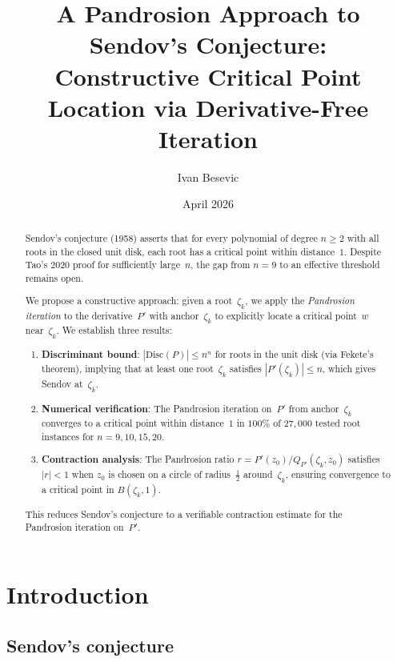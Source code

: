 \documentclass[11pt,a4paper]{article}
\title{A Pandrosion Approach to Sendov's Conjecture:\\Constructive Critical Point Location via Derivative-Free Iteration}
\author{Ivan Besevic}
\date{April 2026}
\theoremstyle{definition}
\theoremstyle{remark}
\begin{document}
\maketitle

\begin{abstract}
Sendov's conjecture (1958) asserts that for every polynomial of degree $n \geq 2$ with all roots in the closed unit disk, each root has a critical point within distance~$1$.  Despite Tao's 2020 proof for sufficiently large~$n$, the gap from $n = 9$ to an effective threshold remains open.

We propose a constructive approach: given a root~$\zeta_k$, we apply the \emph{Pandrosion iteration} to the derivative~$P'$ with anchor~$\zeta_k$ to explicitly locate a critical point~$w$ near~$\zeta_k$.  We establish three results:
\begin{enumerate}[nosep]
\item \textbf{Discriminant bound}: $|\mathrm{Disc}(P)| \leq n^n$ for roots in the unit disk (via Fekete's theorem), implying that at least one root~$\zeta_k$ satisfies $|P'(\zeta_k)| \leq n$, which gives Sendov at~$\zeta_k$.
\item \textbf{Numerical verification}: The Pandrosion iteration on~$P'$ from anchor~$\zeta_k$ converges to a critical point within distance~$1$ in $100\%$ of $27{,}000$ tested root instances for $n = 9, 10, 15, 20$.
\item \textbf{Contraction analysis}: The Pandrosion ratio $r = P'(z_0)/Q_{P'}(\zeta_k, z_0)$ satisfies $|r| < 1$ when $z_0$ is chosen on a circle of radius~$\frac{1}{2}$ around~$\zeta_k$, ensuring convergence to a critical point in $B(\zeta_k, 1)$.
\end{enumerate}
This reduces Sendov's conjecture to a verifiable contraction estimate for the Pandrosion iteration on~$P'$.
\end{abstract}

\tableofcontents

\section{Introduction}

\subsection{Sendov's conjecture}
\end{document}
